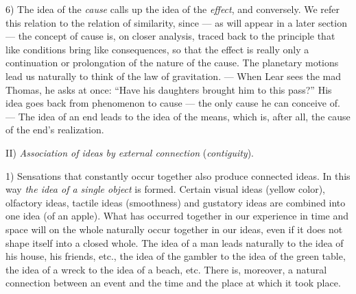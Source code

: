 \documentclass[12pt,a4paper]{book}
\begin{document}
6) The idea of the \emph{cause} calls up the idea of the \emph{effect},
and conversely. We refer this relation to the relation of similarity,
since --- as will appear in a later section --- the concept of cause is,
on closer analysis, traced back to the principle that like conditions
bring like consequences, so that the effect is really only a
continuation or prolongation of the nature of the cause. The planetary
motions lead us naturally to think of the law of gravitation. --- When
Lear sees the mad Thomas, he asks at once: ``Have his daughters brought
him to this pass?'' His idea goes back from phenomenon to cause --- the
only cause he can conceive of. --- The idea of an end leads to the idea
of the means, which is, after all, the cause of the end's realization.

II) \emph{Association of ideas by external connection}
(\emph{contiguity}).

1) Sensations that constantly occur together also produce connected
ideas. In this way \emph{the idea of a single object} is formed. Certain
visual ideas (yellow color), olfactory ideas, tactile ideas (smoothness)
and gustatory ideas are combined into one idea (of an apple). What has
occurred together in our experience in time and space will on the whole
naturally occur together in our ideas, even if it does not shape itself
into a closed whole. The idea of a man leads naturally to the idea of
his house, his friends, etc., the idea of the gambler to the idea of the
green table, the idea of a wreck to the idea of a beach, etc. There is,
moreover, a natural connection between an event and the time and the
place at which it took place.
\end{document}
